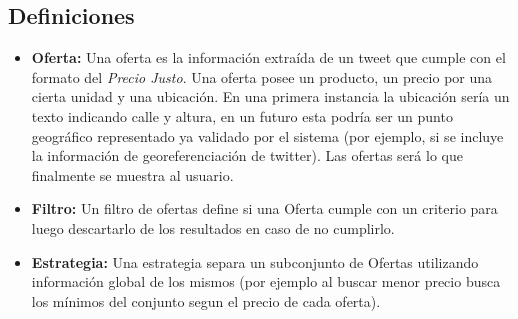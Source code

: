 \documentclass[10pt, a4paper]{article}
\begin{document}
  \subsection{Definiciones}
  \begin{itemize}
    \item\textbf{Oferta:} Una oferta es la información extraída de un tweet que cumple con el formato del \emph{Precio Justo}.
    Una oferta posee un producto, un precio por una cierta unidad y una ubicación. En una primera instancia la ubicación sería
    un texto indicando calle y altura, en un futuro esta podría ser un punto geográfico representado ya validado por el sistema
    (por ejemplo, si se incluye la información de georeferenciación de twitter). Las \textsf{ofertas} será lo que finalmente se
    muestra al usuario.

  \item\textbf{Filtro:} Un filtro de ofertas define si una Oferta cumple con un criterio para luego descartarlo de los
    resultados en caso de no cumplirlo.

  \item\textbf{Estrategia:} Una estrategia separa un subconjunto de \textsf{Ofertas} utilizando información global de los mismos
    (por ejemplo al buscar menor precio busca los mínimos del conjunto segun el precio de cada oferta).
  \end{itemize}
\end{document}
